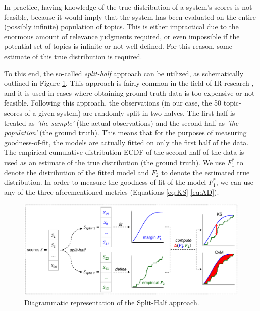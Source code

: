 In practice, having knowledge of the true distribution of a system's scores is not feasible, because it would imply that the system has been evaluated on the entire (possibly infinite) population of topics. This is either impractical due to the enormous amount of relevance judgments required, or even impossible if the potential set of topics is infinite or not well-defined. For this reason, some estimate of this true distribution is required.  

To this end, the so-called \textit{split-half} approach can be utilized, as schematically outlined in Figure \ref{fig:split-half-diag}. This approach is fairly common in the field of IR research \cite{Zobel1998, Voorhees2002, Urbano2013a, Sanderson2005, Cormack2007, Smucker2007}, and it is used in cases where obtaining ground truth data is too expensive or not feasible. Following this approach, the observations (in our case, the 50 topic-scores of a given system) are randomly split in two halves. The first half is treated as \textit{'the sample'} (the actual observations) and the second half as \textit{'the population'} (the ground truth). This means that for the purposes of measuring goodness-of-fit, the models are actually fitted on only the first half of the data. The empirical cumulative distribution ECDF of the second half of the data is used as an estimate of the true distribution (the ground truth). We use $F_1^*$ to denote the distribution of the fitted model and $F_2$ to denote the estimated true distribution. In order to measure the goodness-of-fit of the model $F_1^*$, we can use any of the three aforementioned metrics (Equations \ref{eq:KS}-\ref{eq:AD}). 

\begin{figure}[t]
	\centering	
	\includegraphics[width=1\linewidth]{../diagrams/diag2_splithalf}
	\caption{Diagrammatic representation of the Split-Half approach.}
	\label{fig:split-half-diag}
\end{figure}

